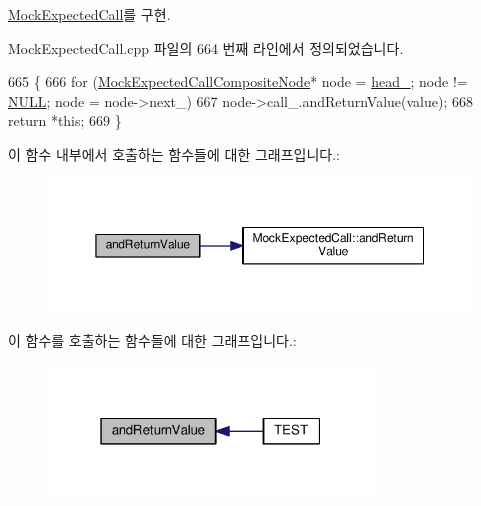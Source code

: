 \hyperlink{class_mock_expected_call_a4827ac954505dd92b7f8d9c2637b3db8}{Mock\+Expected\+Call}를 구현.



Mock\+Expected\+Call.\+cpp 파일의 664 번째 라인에서 정의되었습니다.


\begin{DoxyCode}
665 \{
666     \textcolor{keywordflow}{for} (\hyperlink{struct_mock_expected_call_composite_node}{MockExpectedCallCompositeNode}* node = 
      \hyperlink{class_mock_expected_call_composite_ab2cbb66e9c0941965ada23b66f2e3ca1}{head\_}; node != \hyperlink{openavb__types__base__pub_8h_a070d2ce7b6bb7e5c05602aa8c308d0c4}{NULL}; node = node->next\_)
667         node->call\_.andReturnValue(value);
668     \textcolor{keywordflow}{return} *\textcolor{keyword}{this};
669 \}
\end{DoxyCode}


이 함수 내부에서 호출하는 함수들에 대한 그래프입니다.\+:
\nopagebreak
\begin{figure}[H]
\begin{center}
\leavevmode
\includegraphics[width=350pt]{class_mock_expected_call_composite_aa4f0e19f8446f5ff4843f5ab7602b713_cgraph}
\end{center}
\end{figure}




이 함수를 호출하는 함수들에 대한 그래프입니다.\+:
\nopagebreak
\begin{figure}[H]
\begin{center}
\leavevmode
\includegraphics[width=244pt]{class_mock_expected_call_composite_aa4f0e19f8446f5ff4843f5ab7602b713_icgraph}
\end{center}
\end{figure}


